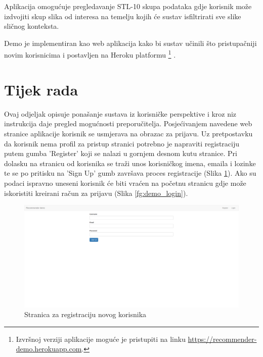 \documentclass[times, utf8, proizvoljni, numeric]{fer}
\begin{document}
Aplikacija omogućuje pregledavanje STL-10 skupa podataka gdje korisnik može izdvojiti skup slika od interesa na temelju kojih će sustav isfiltrirati sve slike sličnog konteksta.

Demo je implementiran kao web aplikacija kako bi sustav učinili što pristupačniji novim korisnicima i postavljen na Heroku platformu \footnote{Izvršnoj verziji aplikacije moguće je pristupiti na linku \url{https://recommender-demo.herokuapp.com}.} .


\section{Tijek rada}

Ovaj odjeljak opisuje ponašanje sustava iz korisničke perspektive i kroz niz instrukcija daje pregled mogućnosti preporučitelja. Posjećivanjem navedene web stranice aplikacije korisnik se usmjerava na obrazac za prijavu. Uz pretpostavku da korisnik nema profil za pristup stranici potrebno je napraviti registraciju putem gumba 'Register' koji se nalazi u gornjem desnom kutu stranice. Pri dolasku na stranicu od korisnika se traži unos korisničkog imena, emaila i lozinke te se po pritisku na 'Sign Up' gumb završava proces registracije (Slika \ref{fg:demo_register}). Ako su podaci ispravno uneseni korisnik će biti vraćen na početnu stranicu gdje može iskoristiti kreirani račun za prijavu (Slika \ref{fg:demo_login}). 
 
\begin{figure}[!ht]
	\begin{center}
		\captionsetup{justification=centering}
		\includegraphics[width=1.0\textwidth]{./imgs/demo-preporucitelja-po-sadrzaju/tijek-rada/demo-regi.png}
		\caption{Stranica za registraciju novog korisnika}
		\label{fg:demo_register}
	\end{center}
\end{figure}
\end{document}
